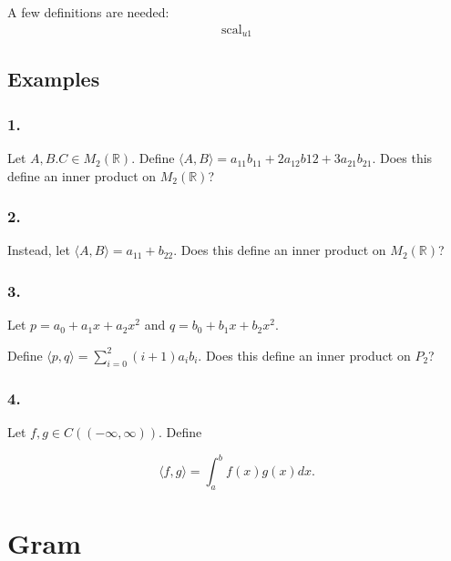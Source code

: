 \documentclass[a4paper,10pt]{report}
\begin{document}
A few definitions are needed:
\begin{align*}
 \text{scal}_{u1}
\end{align*}


\subsection{Examples}
\subsubsection*{1.}
Let $A, B. C \in M_2 (\mathbb{R})$. Define $\langle A,B\rangle = a_{11}b_{11}+2a_{12}b{12}+3a_{21}b_{21}$. Does this define an inner product on $M_2 (\mathbb{R})$?

\subsubsection{2.}
Instead, let $\langle A,B\rangle = a_{11} + b_{22}$. Does this define an inner product on $M_2(\mathbb{R})$?

\subsubsection{3.}
Let $p=a_0 + a_1 x + a_2 x^2$ and $q=b_0 + b_1 x + b_2 x^2$.

Define $\langle p,q\rangle = \sum_{i=0}^{2}(i+1)a_i b_i$. Does this define an inner product on $P_2$?

\subsubsection{4.}
Let $f,g \in C((-\infty, \infty))$. Define

\begin{equation*}
\langle f,g\rangle = \int_a^b f(x)g(x)dx.
\end{equation*}

\section{Gram}
\end{document}
